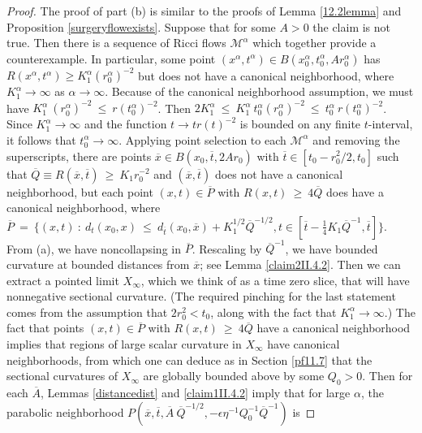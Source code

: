 \documentclass[12pt]{amsart}
\newcommand{\al}{\alpha}
\newcommand{\M}{{\mathcal M}}
\numberwithin{equation}{section}
\theoremstyle{plain}
\theoremstyle{definition}
\theoremstyle{remark}
\begin{document}
\begin{proof}
The proof of part (b) 
is similar to the proofs of 
Lemma \ref{12.2lemma}
and Proposition \ref{surgeryflowexists}.
Suppose that for some $A > 0$ the claim is not true. Then there
is a sequence of Ricci flows $\M^\al$ which together provide a
counterexample.  In particular, some point $(x^\al, t^\al) \in
B(x_0^\al, t_0^\al, A r_0^\al)$ has $R(x^\al, t^\al) \ge K_1^\al
(r_0^\al)^{-2}$ but does not have a canonical neighborhood, where
$K_1^\al \rightarrow \infty$ as $\al \rightarrow \infty$. 
Because of the canonical neighborhood
assumption, we must have $K_1^\al \: (r_0^{\al})^{-2} \: \le \:
r(t_0^{\al})^{-2}$.
Then $2 K_1^{\al} \: \le \: K_1^{\al} \: t_0^{\al} (r_0^{\al})^{-2} 
\: \le \: t_0^{\al} \: r(t_0^{\al})^{-2}$. Since $K_1^{\al}
\rightarrow \infty$ and
the function $t \rightarrow t r(t)^{-2}$ is bounded on any finite
$t$-interval, it follows that $t_0^\al \rightarrow \infty$.
Applying point selection to each
$\M^\al$ and removing the superscripts, there are points
$\overline{x} \in B(x_0, \overline{t}, 2Ar_0)$ with
$\overline{t} \in [t_0 - r_0^2/2, t_0]$ such that
$\overline{Q} \equiv R(\overline{x}, \overline{t}) \: \ge \:
K_1 r_0^{-2}$ and $(\overline{x}, \overline{t})$ does not have a
canonical neighborhood, but each point $(x, t) \in \overline{P}$
with $R(x, t) \: \ge \: 4 \overline{Q}$ does have a canonical
neighborhood, where $\overline{P} \: = \: 
\{(x, t) \: : \: d_t(x_0, x) \: \le \: d_{\overline{t}}(x_0,
\overline{x}) + K_1^{1/2} \overline{Q}^{-1/2}, t \in
[\overline{t} - \frac14 K_1 \overline{Q}^{-1}, \overline{t}]\}$.
From (a), we have noncollapsing in $\overline{P}$. Rescaling by
$\overline{Q}^{-1}$, we have bounded curvature at bounded distances
from $\overline{x}$; see Lemma \ref{claim2II.4.2}.
Then we can extract a pointed limit $X_\infty$, which we think of as
a time zero slice, that
will have nonnegative sectional curvature.
(The required pinching for the last statement comes from the assumption that
$2r_0^2 < t_0$, along with the fact that $K_1^\al \rightarrow \infty$.)
The fact that
points $(x, t) \in \overline{P}$
with $R(x, t) \: \ge \: 4 \overline{Q}$ have a canonical
neighborhood implies that regions of large scalar curvature in $X_\infty$
have canonical neighborhoods, from which one can
deduce as in Section \ref{pf11.7} that
the sectional curvatures of $X_\infty$ are globally bounded above
by some $Q_0 > 0$.
Then for each $\overline{A}$, 
Lemmas \ref{distancedist} and \ref{claim1II.4.2}
imply that for large $\al$, the parabolic neighborhood
$P(\overline{x}, \overline{t}, \overline{A} \: \overline{Q}^{-1/2},
- \epsilon \eta^{-1} Q_0^{-1} \overline{Q}^{-1})$ is

\end{proof}
\end{document}
